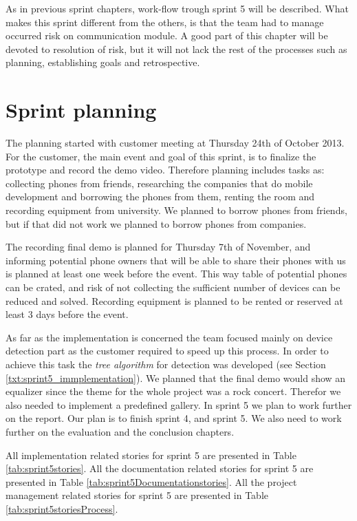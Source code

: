 \label{chap:sprint5}
As in previous sprint chapters, work-flow trough sprint 5 will be described. What makes this sprint different from the others, is that the team had to manage occurred risk on communication module. A good part of this chapter will be devoted to resolution of risk, but it will not lack the rest of the processes such as planning, establishing goals and retrospective.

\section{Sprint planning}

The planning started with customer meeting at Thursday 24th of October 2013. For the customer, the main event and goal of this sprint, is to finalize the prototype and record the demo video. Therefore planning includes tasks as: collecting phones from friends, researching the companies that do mobile development and borrowing the phones from them, renting the room and recording equipment from university. We planned to borrow phones from friends, but if that did not work we planned to borrow phones from companies.

The recording final demo is planned for Thursday 7th of November, and informing potential phone owners that will be able to share their phones with us is planned at least one week before the event. This way table of potential phones can be crated, and risk of not collecting the sufficient number of devices can be reduced and solved. Recording equipment is planned to be rented or reserved at least 3 days before the event.

As far as the implementation is concerned the team focused mainly on device detection part as the customer required to speed up this process. In order to achieve this task the \textit{tree algorithm} for detection was developed (see Section \ref{txt:sprint5_immplementation}). We planned that the final demo would show an equalizer since the theme for the whole project was a rock concert. Therefor we also needed to implement a predefined gallery.
In sprint 5 we plan to work further on the report. Our plan is to finish sprint 4, and sprint 5. We also need to work further on the evaluation and the conclusion chapters.  

All implementation related stories for sprint 5 are presented in Table \ref{tab:sprint5stories}.
 All the documentation related stories for sprint 5 are presented in Table \ref{tab:sprint5Documentationstories}.
 All the project management related stories for sprint 5 are presented in Table \ref{tab:sprint5storiesProcess}.


